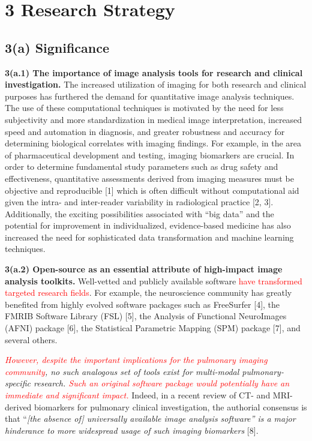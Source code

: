 \documentclass[11pt,]{article}
\begin{document}
\newpage

\section{3 Research Strategy}\label{research-strategy}

\subsection{\texorpdfstring{\textbf{3(a)
Significance}}{3(a) Significance}}\label{a-significance}

\textbf{3(a.1) The importance of image analysis tools for research and
clinical investigation.} The increased utilization of imaging for both
research and clinical purposes has furthered the demand for quantitative
image analysis techniques. The use of these computational techniques is
motivated by the need for less subjectivity and more standardization in
medical image interpretation, increased speed and automation in
diagnosis, and greater robustness and accuracy for determining
biological correlates with imaging findings. For example, in the area of
pharmaceutical development and testing, imaging biomarkers are crucial.
In order to determine fundamental study parameters such as drug safety
and effectiveness, quantitative assessments derived from imaging
measures must be objective and reproducible {[}1{]} which is often
difficult without computational aid given the intra- and inter-reader
variability in radiological practice {[}2, 3{]}. Additionally, the
exciting possibilities associated with ``big data'' and the potential
for improvement in individualized, evidence-based medicine has also
increased the need for sophisticated data transformation and machine
learning techniques.

\textbf{3(a.2) Open-source as an essential attribute of high-impact
image analysis toolkits.} Well-vetted and publicly available software
\textcolor{red}{have transformed targeted research fields}. For example,
the neuroscience community has greatly benefited from highly evolved
software packages such as FreeSurfer {[}4{]}, the FMRIB Software Library
(FSL) {[}5{]}, the Analysis of Functional NeuroImages (AFNI) package
{[}6{]}, the Statistical Parametric Mapping (SPM) package {[}7{]}, and
several others.

\emph{\textcolor{red}{However, despite the important implications for the pulmonary imaging
community}, no such analogous set of tools exist for multi-modal
pulmonary-specific research.
\textcolor{red}{Such an original software package would potentially have an immediate and
significant impact.}} Indeed, in a recent review of CT- and MRI-derived
biomarkers for pulmonary clinical investigation, the authorial consensus
is that ``\emph{{[}the absence of{]} universally available image
analysis software'' is a major hinderance to more widespread usage of
such imaging biomarkers} {[}8{]}.
\end{document}
